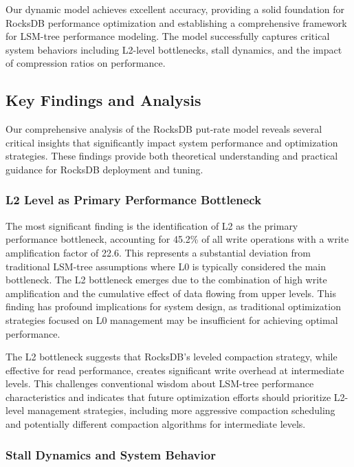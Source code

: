\documentclass[11pt]{article}
\begin{document}
Our dynamic model achieves excellent accuracy, providing a solid foundation for RocksDB performance optimization and establishing a comprehensive framework for LSM-tree performance modeling. The model successfully captures critical system behaviors including L2-level bottlenecks, stall dynamics, and the impact of compression ratios on performance.

\subsection{Key Findings and Analysis}

Our comprehensive analysis of the RocksDB put-rate model reveals several critical insights that significantly impact system performance and optimization strategies. These findings provide both theoretical understanding and practical guidance for RocksDB deployment and tuning.

\subsubsection{L2 Level as Primary Performance Bottleneck}

The most significant finding is the identification of L2 as the primary performance bottleneck, accounting for 45.2\% of all write operations with a write amplification factor of 22.6. This represents a substantial deviation from traditional LSM-tree assumptions where L0 is typically considered the main bottleneck. The L2 bottleneck emerges due to the combination of high write amplification and the cumulative effect of data flowing from upper levels. This finding has profound implications for system design, as traditional optimization strategies focused on L0 management may be insufficient for achieving optimal performance.

The L2 bottleneck suggests that RocksDB's leveled compaction strategy, while effective for read performance, creates significant write overhead at intermediate levels. This challenges conventional wisdom about LSM-tree performance characteristics and indicates that future optimization efforts should prioritize L2-level management strategies, including more aggressive compaction scheduling and potentially different compaction algorithms for intermediate levels.

\subsubsection{Stall Dynamics and System Behavior}
\end{document}
